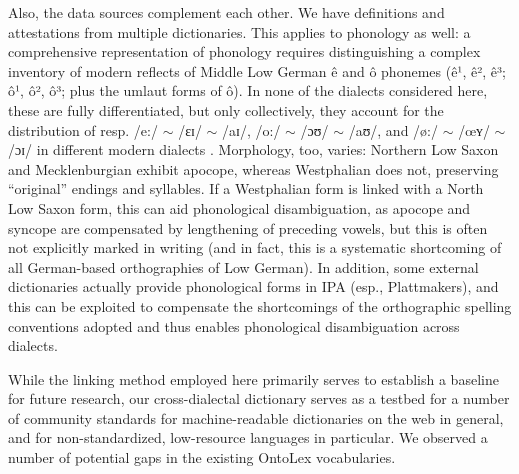 \documentclass[11pt]{article}
\begin{document}

Also, the data sources complement each other. We have definitions and attestations from multiple dictionaries. This applies to phonology as well: a comprehensive representation of phonology requires distinguishing a complex inventory of modern reflects of Middle Low German ê and ô phonemes (ê¹, ê², ê³; ô¹, ô², ô³; plus the umlaut forms of ô). 
In none of the dialects considered here, these are fully differentiated, but only collectively, they account for the distribution of resp. /e:/ $\sim$ /ɛɪ/ $\sim$ /aɪ/, /o:/ $\sim$ /ɔʊ/ $\sim$ /aʊ/, and /ø:/ $\sim$ /œʏ/ $\sim$ /ɔɪ/ in different modern dialects \cite{seelmann1908mundart}. Morphology, too, varies: Northern Low Saxon and Mecklenburgian exhibit apocope, whereas Westphalian does not, preserving ``original'' endings and syllables. If a Westphalian form is linked with a North Low Saxon form, this can aid phonological disambiguation, as apocope and syncope are compensated by lengthening of preceding vowels, but this is often not explicitly marked in writing (and in fact, this is a systematic shortcoming of all German-based orthographies of Low German). In addition, some external dictionaries actually provide phonological forms in IPA (esp., Plattmakers), and this can be exploited to compensate the shortcomings of the orthographic spelling conventions adopted and thus enables phonological disambiguation across dialects.

While the linking method employed here primarily serves to establish a baseline for future research, our cross-dialectal dictionary serves as a testbed for a number of community standards for machine-readable dictionaries on the web in general, and for non-standardized, low-resource languages in particular.
We observed a number of potential gaps in the existing OntoLex vocabularies. 
\end{document}
